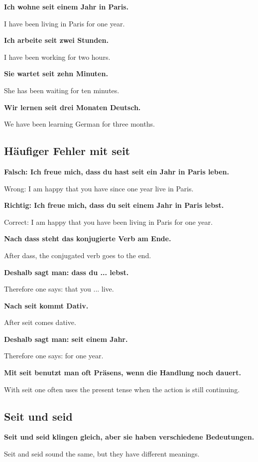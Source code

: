 \documentclass[a4paper]{article}
\newcommand{\EN}[1]{\par{\small\textcolor{TranslationGray}{#1}}\vspace{0.4em}}
\begin{document}
            \textbf{Ich wohne seit einem Jahr in Paris.}
            \EN{I have been living in Paris for one year.}
            
            \textbf{Ich arbeite seit zwei Stunden.}
            \EN{I have been working for two hours.}
            
            \textbf{Sie wartet seit zehn Minuten.}
            \EN{She has been waiting for ten minutes.}
            
            \textbf{Wir lernen seit drei Monaten Deutsch.}
            \EN{We have been learning German for three months.}
        
        \subsection{Häufiger Fehler mit seit}
            
            \textbf{Falsch: Ich freue mich, dass du hast seit ein Jahr in Paris leben.}
            \EN{Wrong: I am happy that you have since one year live in Paris.}
            
            \textbf{Richtig: Ich freue mich, dass du seit einem Jahr in Paris lebst.}
            \EN{Correct: I am happy that you have been living in Paris for one year.}
            
            \textbf{Nach dass steht das konjugierte Verb am Ende.}
            \EN{After dass, the conjugated verb goes to the end.}
            
            \textbf{Deshalb sagt man: dass du ... lebst.}
            \EN{Therefore one says: that you ... live.}
            
            \textbf{Nach seit kommt Dativ.}
            \EN{After seit comes dative.}
            
            \textbf{Deshalb sagt man: seit einem Jahr.}
            \EN{Therefore one says: for one year.}
            
            \textbf{Mit seit benutzt man oft Präsens, wenn die Handlung noch dauert.}
            \EN{With seit one often uses the present tense when the action is still continuing.}
        
        \subsection{Seit und seid}
            
            \textbf{Seit und seid klingen gleich, aber sie haben verschiedene Bedeutungen.}
            \EN{Seit and seid sound the same, but they have different meanings.}
            
\end{document}

